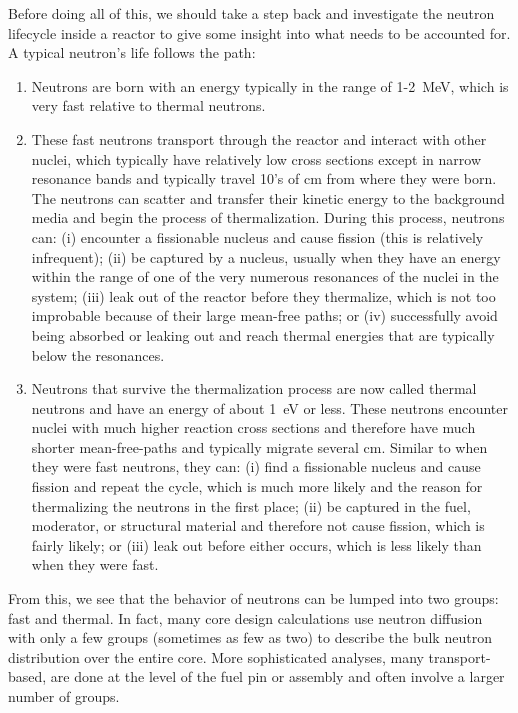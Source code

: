 Before doing all of this, we should take a step back and investigate the neutron lifecycle inside a reactor to give some insight into what needs to be accounted for. A typical neutron's life follows the path:
\begin{enumerate}
  \item Neutrons are born with an energy typically in the range of 1-2~MeV, which is very fast relative to thermal neutrons.
  \item These fast neutrons transport through the reactor and interact with other nuclei, which typically have relatively low cross sections except in narrow resonance bands and typically travel 10's of cm from where they were born. The neutrons can scatter and transfer their kinetic energy to the background media and begin the process of thermalization. During this process, neutrons can: (i) encounter a fissionable nucleus and cause fission (this is relatively infrequent); (ii) be captured by a nucleus, usually when they have an energy within the range of one of the very numerous resonances of the nuclei in the system; (iii) leak out of the reactor before they thermalize, which is not too improbable because of their large mean-free paths; or (iv) successfully avoid being absorbed or leaking out and reach thermal energies that are typically below the resonances.
  \item Neutrons that survive the thermalization process are now called thermal neutrons and have an energy of about 1~eV or less. These neutrons encounter nuclei with much higher reaction cross sections and therefore have much shorter mean-free-paths and typically migrate several cm. Similar to when they were fast neutrons, they can: (i) find a fissionable nucleus and cause fission and repeat the cycle, which is much more likely and the reason for thermalizing the neutrons in the first place; (ii) be captured in the fuel, moderator, or structural material and therefore not cause fission, which is fairly likely; or (iii) leak out before either occurs, which is less likely than when they were fast.
\end{enumerate}

From this, we see that the behavior of neutrons can be lumped into two groups: fast and thermal. In fact, many core design calculations use neutron diffusion with only a few groups (sometimes as few as two) to describe the bulk neutron distribution over the entire core. More sophisticated analyses, many transport-based, are done at the level of the fuel pin or assembly and often involve a larger number of groups. 


